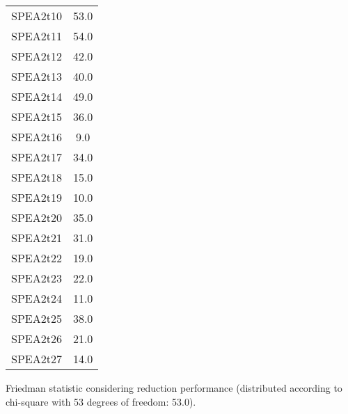\documentclass{article}
\begin{document}
\begin{table}[!htp]
\begin{tabular}{c|c}
SPEA2t10&53.0\\
SPEA2t11&54.0\\
SPEA2t12&42.0\\
SPEA2t13&40.0\\
SPEA2t14&49.0\\
SPEA2t15&36.0\\
SPEA2t16&9.0\\
SPEA2t17&34.0\\
SPEA2t18&15.0\\
SPEA2t19&10.0\\
SPEA2t20&35.0\\
SPEA2t21&31.0\\
SPEA2t22&19.0\\
SPEA2t23&22.0\\
SPEA2t24&11.0\\
SPEA2t25&38.0\\
SPEA2t26&21.0\\
SPEA2t27&14.0\\
\end{tabular}
\end{table}


Friedman statistic considering reduction performance (distributed according to chi-square with 53 degrees of freedom: 53.0).
\end{document}
